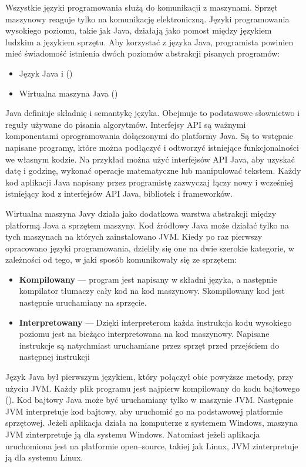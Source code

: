 Wszystkie języki programowania służą do komunikacji z maszynami. Sprzęt maszynowy reaguje tylko na komunikację elektroniczną. Języki programowania wysokiego poziomu, takie jak Java, działają jako pomost między językiem ludzkim a językiem sprzętu. Aby korzystać z języka Java, programista powinien mieć świadomość istnienia dwóch poziomów abstrakcji pisanych programów: 

\begin{itemize}
    \item Język Java i ()
    \item Wirtualna maszyna Java  ()
\end{itemize}

Java definiuje składnię i semantykę języka. Obejmuje to podstawowe słownictwo i reguły używane do pisania algorytmów. 
Interfejsy API są ważnymi komponentami oprogramowania dołączonymi do platformy Java. Są to wstępnie napisane programy, które można podłączyć i odtworzyć istniejące funkcjonalności we własnym kodzie. Na przykład można użyć interfejsów API Java, aby uzyskać datę i godzinę, wykonać operacje matematyczne lub manipulować tekstem. Każdy kod aplikacji Java napisany przez programistę zazwyczaj łączy nowy i wcześniej istniejący kod z interfejsów API Java, bibliotek i frameworków\cite{frameworkDef}\cite{javaAmazon}\cite{javaDEV}.

Wirtualna maszyna Javy działa jako dodatkowa warstwa abstrakcji między platformą Java a sprzętem maszyny. Kod źródłowy Java może działać tylko na tych maszynach na których zainstalowano JVM. Kiedy po raz pierwszy opracowano języki programowania, dzieliły się one na dwie szerokie kategorie, w zależności od tego, w jaki sposób komunikowały się ze sprzętem: 

\begin{itemize}
    \item \textbf{Kompilowany} --- program jest napisany w składni języka, a następnie kompilator tłumaczy cały kod na kod maszynowy. Skompilowany kod jest następnie uruchamiany na sprzęcie.
    \item \textbf{Interpretowany} --- Dzięki interpreterom każda instrukcja kodu wysokiego poziomu jest na bieżąco interpretowana na kod maszynowy. Napisane instrukcje są natychmiast uruchamiane przez sprzęt przed przejściem do następnej instrukcji
\end{itemize}

Język Java był pierwszym językiem, który połączył obie powyższe metody, przy użyciu JVM. Każdy plik programu jest najpierw kompilowany do kodu bajtowego (). Kod bajtowy Java może być uruchamiany tylko w maszynie JVM. Następnie JVM interpretuje kod bajtowy, aby uruchomić go na podstawowej platformie sprzętowej. Jeżeli aplikacja działa na komputerze z systemem Windows, maszyna JVM zinterpretuje ją dla systemu Windows. Natomiast jeżeli aplikacja uruchomiona jest na platformie open--source, takiej jak Linux, JVM zinterpretuje ją dla systemu Linux\cite{javaAmazon}\cite{javaDEV}.

